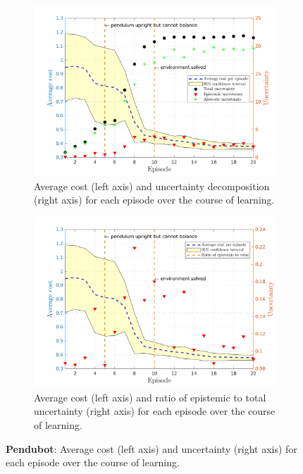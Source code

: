 \begin{figure}[htbp]    
   \begin{subfigure}[b]{1\linewidth}
    \centering
    \includegraphics[height=0.4\textheight,width=1\textwidth]{Chapter3/Figures/pen_uncertainty.png} 
    \caption{Average cost (left axis) and uncertainty decomposition (right axis) for each episode over the course of learning.} 
    \label{Fig:Re-pen-uncertainty} 
  \end{subfigure}
  \hspace{\fill}
  \begin{subfigure}[b]{1\linewidth}
    \centering
    \includegraphics[height=0.4\textheight,width=1\textwidth]{Chapter3/Figures/pen_uncertainty_norm.png} 
    \caption{Average cost (left axis) and ratio of epistemic to total uncertainty (right axis) for each episode over the course of learning.} 
    \label{Fig:Re-pen-uncertainty-norm} 
  \end{subfigure} 
\caption[Uncertainty decomposition for \textbf{pendubot} environment]{\textbf{Pendubot}: Average cost (left axis) and uncertainty (right axis) for each episode over the course of learning.}
\label{Fig:Re-pen-full-uncertainty} 
\end{figure}


